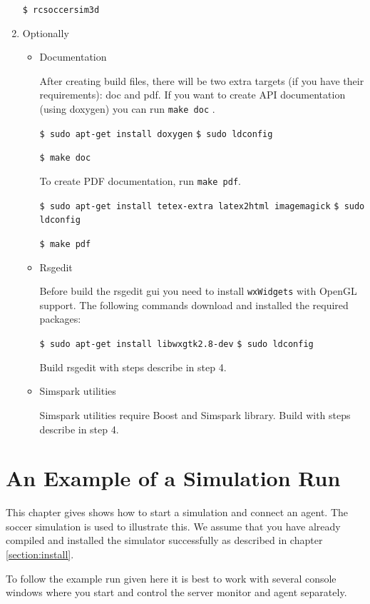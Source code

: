 \begin{enumerate}
\texttt{\$ rcsoccersim3d}

\item Optionally

\begin{itemize}
\item Documentation

After creating build files, there will be two extra targets (if you have their requirements): doc and pdf. If you want to create API documentation (using doxygen) you can run \texttt{make doc} .

\texttt{\$ sudo apt-get install doxygen}
\texttt{\$ sudo ldconfig}

\texttt{\$ make doc}

To create PDF documentation, run \texttt{make pdf}.

\texttt{\$ sudo apt-get install tetex-extra latex2html imagemagick}
\texttt{\$ sudo ldconfig}

\texttt{\$ make pdf}

\item Rsgedit

Before build the rsgedit gui you need to install \texttt{wxWidgets} with OpenGL support. The following commands download and installed the required packages:

\texttt{\$ sudo apt-get install libwxgtk2.8-dev}
\texttt{\$ sudo ldconfig}

Build rsgedit with steps describe in step 4.

\item Simspark utilities

Simspark utilities require Boost and Simspark library. Build with steps describe in step 4.

\end{itemize}
\end{enumerate}

\section{An Example of a Simulation Run}

This chapter gives shows how to start a simulation and connect an
agent. The soccer simulation is used to illustrate this. We assume
that you have already compiled and installed the simulator successfully
as described in chapter \ref{section:install}. 

To follow the example run given here it is best to work with several
console windows where you start and control the server monitor and
agent separately.

